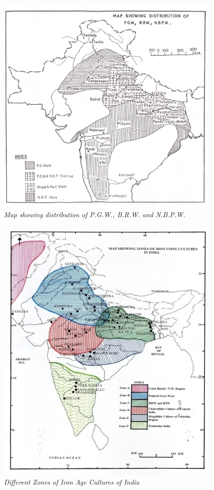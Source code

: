 \begin{figure}[H]
\includegraphics[scale=.5]{images/chapter-1/fig001.jpg}
\caption{\textit{Map showing distribution of P.G.W., B.R.W. and N.B.P.W.}}\label{chapter1-fig001}
\end{figure}

\newpage


\begin{figure}[H]
\includegraphics[scale=1.5]{images/chapter-1/fig002.jpg}
\caption{\textit{Different Zones of Iron Age Cultures of India}}\label{chapter1-fig002}
\end{figure}


